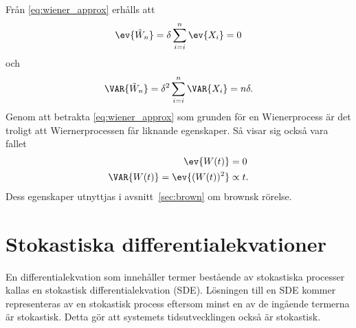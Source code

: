 Från \eqref{eq:wiener_approx} erhålls att 
\begin{equation}
\ev{\tilde{W}_n} = \delta \sum_{i=i}^n \ev{X_i} = 0
\end{equation}
och
\begin{equation}
\VAR{\tilde{W}_n} = \delta^2 \sum_{i=i}^n \VAR{X_i} = n\delta.
\end{equation}
Genom att betrakta \eqref{eq:wiener_approx} som grunden för en Wienerprocess är det troligt att Wiernerprocessen får liknande egenskaper. Så visar sig också vara fallet~\cite{Miller_probability2012}
\begin{equation}
\begin{aligned}
\ev{W(t)} &= 0\\
\VAR{ W(t) } = \ev{ (W(t))^2 } &\propto t.
\end{aligned}
\end{equation}
Dess egenskaper utnyttjas i avsnitt~\ref{sec:brown} om brownsk rörelse.














\section{Stokastiska differentialekvationer}
En differentialekvation som innehåller termer bestående av stokastiska processer kallas en stokastisk differentialekvation (SDE). Lösningen till en SDE kommer representeras av en stokastisk process eftersom minst en av de ingående termerna är stokastisk. Detta gör att systemets tidsutvecklingen också är stokastisk.

